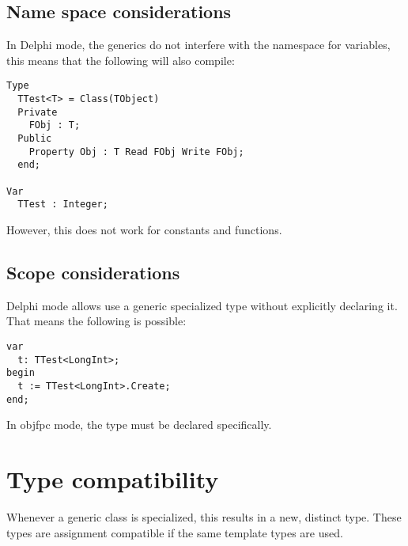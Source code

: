 \subsection{Name space considerations}
In Delphi mode, the generics do not interfere with the namespace for variables, this means that the following will also compile:
\begin{verbatim}
Type
  TTest<T> = Class(TObject)
  Private
    FObj : T;
  Public
    Property Obj : T Read FObj Write FObj;
  end;

Var
  TTest : Integer;
\end{verbatim}
However, this does not work for constants and functions.

\subsection{Scope considerations}
Delphi mode allows use a generic specialized type without explicitly declaring it. That means the following is possible:
\begin{verbatim}
var
  t: TTest<LongInt>;
begin
  t := TTest<LongInt>.Create;
end;
\end{verbatim}
In objfpc mode, the type must be declared specifically.

\section{Type compatibility}
Whenever a generic class is specialized, this results in a new, distinct type.
These types are assignment compatible if the same template types are used.

